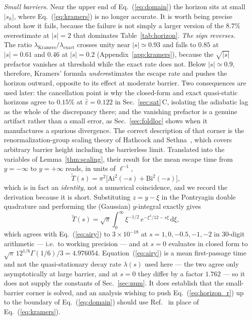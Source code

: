 \documentclass[%
 twocolumn,
 superscriptaddress,
 amsmath,amssymb,
 aps,
 pre,
 floatfix,
]{revtex4-2}
\newcommand{\dd}{\mathrm{d}}
\newcommand{\Sig}{\hat\varepsilon}
\begin{document}
\emph{Small barriers.}  Near the upper end of Eq.~(\ref{eq:domain}) the horizon sits at small $|s_h|$, where Eq.~(\ref{eq:kramers}) is no longer accurate.  It is worth being precise about how it fails, because the failure is not simply a larger version of the $8.7\%$ overestimate at $|s|=2$ that dominates Table~\ref{tab:horizon}.  \emph{The sign reverses.}  The ratio $\lambda_{\mathrm{Kramers}}/\lambda_{\mathrm{exact}}$ crosses unity near $|s|\simeq0.93$ and falls to $0.85$ at $|s|=0.61$ and $0.46$ at $|s|=0.2$ (Appendix~\ref{app:kramers}), because the $\sqrt{|s|}$ prefactor vanishes at threshold while the exact rate does not.  Below $|s|\simeq0.9$, therefore, Kramers' formula \emph{under}estimates the escape rate and pushes the horizon outward, opposite to its effect at moderate barrier.  Two consequences are used later: the cancellation point is why the closed-form and exact quasi-static horizons agree to $0.15\%$ at $\Sig=0.122$ in Sec.~\ref{sec:sat}\,C, isolating the adiabatic lag as the whole of the discrepancy there; and the vanishing prefactor is a genuine artifact rather than a small error, as Sec.~\ref{sec:foldloc} shows when it manufactures a spurious divergence.  The correct description of that corner is the renormalization-group scaling theory of Hathcock and Sethna~\cite{HathcockSethna2021}, which covers arbitrary barrier height including the barrierless limit.  Translated into the variables of Lemma~\ref{thm:scaling}, their result for the mean escape time from $y=-\infty$ to $y=+\infty$ reads, in units of $\ell^{-1}$,
\begin{equation}
\label{eq:airy}
\tilde T(s)=\pi^2\bigl[\mathrm{Ai}^2(-s)+\mathrm{Bi}^2(-s)\bigr],
\end{equation}
which is in fact an \emph{identity}, not a numerical coincidence, and we record the derivation because it is short.  Substituting $z=y-\xi$ in the Pontryagin double quadrature and performing the (Gaussian) $y$-integral exactly gives
\begin{equation}
\label{eq:airyid}
\tilde T(s)=\sqrt\pi\int_0^\infty\xi^{-1/2}\,e^{-\xi^3/12-s\xi}\,\dd\xi ,
\end{equation}
which agrees with Eq.~(\ref{eq:airy}) to $3\times10^{-18}$ at $s=1,0,-0.5,-1,-2$ in $30$-digit arithmetic --- i.e.\ to working precision --- and at $s=0$ evaluates in closed form to $\sqrt\pi\,12^{1/6}\Gamma(1/6)/3=4.976054$.  Equation~(\ref{eq:airy}) is a mean first-passage time and not the quasi-stationary decay rate $\lambda(s)$ used here --- the two agree only asymptotically at large barrier, and at $s=0$ they differ by a factor $1.762$ --- so it does not supply the constants of Sec.~\ref{sec:num}.  It does establish that the small-barrier corner is solved, and an analysis wishing to push Eq.~(\ref{eq:horizon_r}) up to the boundary of Eq.~(\ref{eq:domain}) should use Ref.~\cite{HathcockSethna2021} in place of Eq.~(\ref{eq:kramers}).
\end{document}
